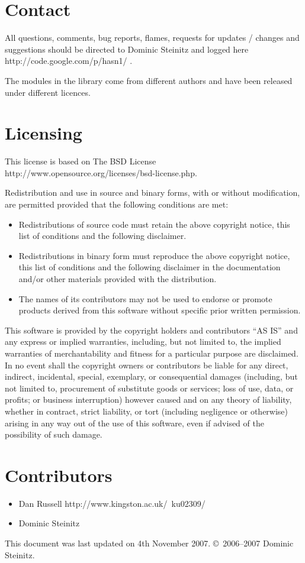 \documentclass{article}
\begin{document}
\section{Contact}

All questions, comments, bug reports, flames, requests for 
updates / changes and suggestions should be directed to Dominic Steinitz and
logged
\htmladdnormallinkfoot
{here}
{http://code.google.com/p/hasn1/}
.


The modules in the library come from different authors and have been 
released under different licences. 

\section{Licensing}

This license is based on
\htmladdnormallinkfoot
{The BSD License}
{http://www.opensource.org/licenses/bsd-license.php}.

Redistribution and use in source and binary forms, with or without 
modification, are permitted provided that the following conditions are met:

\begin{itemize}
\item
Redistributions of source code must retain the above copyright notice, 
this list of conditions and the following disclaimer.
\item
Redistributions in binary form must reproduce the above copyright notice, 
this list of conditions and the following disclaimer in the documentation 
and/or other materials provided with the distribution.
\item
The names of its contributors may not be used to endorse or promote 
products derived from this software without specific prior written permission.
\end{itemize}

\begin{sc}
This software is provided by the copyright holders and contributors ``AS IS'' 
and any express or implied warranties, including, but not limited to, 
the implied warranties of merchantability and fitness for a particular 
purpose are disclaimed. In no event shall the copyright owners or
contributors be liable for any direct, indirect, incidental, special,
exemplary, or consequential damages (including, but not limited to,
procurement of substitute goods or services; loss of use, data, or profits;
or business interruption) however caused and on any theory of liability,
whether in contract, strict liability, or tort (including negligence or
otherwise) arising in any way out of the use of this software,
even if advised of the possibility of such damage.
\end{sc}

\section{Contributors}

\begin{itemize}

\item
\htmladdnormallinkfoot
   {Dan Russell}
   {http://www.kingston.ac.uk/~ku02309/}

\item
Dominic Steinitz

\end{itemize}

This document was last updated on 4th November 2007.
\copyright\ 2006--2007 Dominic Steinitz. 
\end{document}
